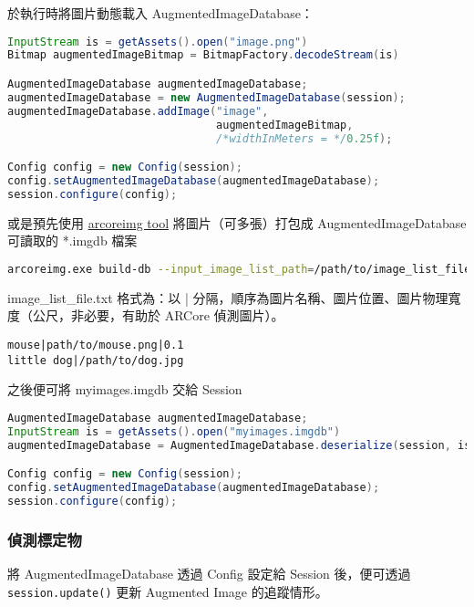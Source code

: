於執行時將圖片動態載入 AugmentedImageDatabase：

\begin{lstlisting}[language=Java, caption=動態載入圖片]
InputStream is = getAssets().open("image.png")
Bitmap augmentedImageBitmap = BitmapFactory.decodeStream(is)

AugmentedImageDatabase augmentedImageDatabase;
augmentedImageDatabase = new AugmentedImageDatabase(session);
augmentedImageDatabase.addImage("image",　
                                augmentedImageBitmap,
                                /*widthInMeters = */0.25f);

Config config = new Config(session);
config.setAugmentedImageDatabase(augmentedImageDatabase);
session.configure(config);
\end{lstlisting}

或是預先使用 \href{https://developers.google.com/ar/develop/java/augmented-images/arcoreimg}{arcoreimg tool} 將圖片（可多張）打包成 AugmentedImageDatabase 可讀取的 *.imgdb 檔案

\begin{lstlisting}[language=bash, caption=使用 arcoreimg tool 將圖片打包]
arcoreimg.exe build-db --input_image_list_path=/path/to/image_list_file.txt --output_db_path=/path/to/myimages.imgdb
\end{lstlisting}

image\_list\_file.txt 格式為：以 | 分隔，順序為圖片名稱、圖片位置、圖片物理寬度（公尺，非必要，有助於 ARCore 偵測圖片）。

\begin{lstlisting}[caption=image\_list\_file.txt 範例]
mouse|path/to/mouse.png|0.1
little dog|/path/to/dog.jpg
\end{lstlisting}

之後便可將 myimages.imgdb 交給 Session

\begin{lstlisting}[language=Java, caption=將 myimages.imgdb 交給 Session]
AugmentedImageDatabase augmentedImageDatabase;
InputStream is = getAssets().open("myimages.imgdb")
augmentedImageDatabase = AugmentedImageDatabase.deserialize(session, is);

Config config = new Config(session);
config.setAugmentedImageDatabase(augmentedImageDatabase);
session.configure(config);
\end{lstlisting}

\subsubsection{偵測標定物}
將 AugmentedImageDatabase 透過 Config 設定給 Session 後，便可透過 \lstinline{session.update()} 更新 Augmented Image 的追蹤情形。

